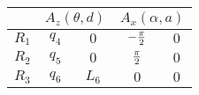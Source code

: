 \begin{tabular}{c|c|c|c|c|}  
            \cline{2-5} &
            \multicolumn{2}{|c|}{$A_z(\theta,d)$} &
            \multicolumn{2}{|c|}{$A_x(\alpha,a)$} \\
            \hline
        \multicolumn{1}{|c|}{$R_1$} & $q_{4}$ & $0$ & $-{{\pi}\over{2}}$ & $0$ \\
            \hline
        \multicolumn{1}{|c|}{$R_2$} & $q_{5}$ & $0$ & ${{\pi}\over{2}}$ & $0$ \\
            \hline
        \multicolumn{1}{|c|}{$R_3$} & $q_{6}$ & $L_{6}$ & $0$ & $0$ \\
            \hline
\end{tabular}
